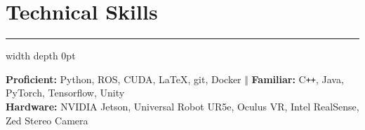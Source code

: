 \documentclass[11pt]{article}
\begin{document}
    \section*{Technical Skills}
        \hrule height 0.5pt width \textwidth depth 0pt \relax
        \vspace{0.1cm}

        \textbf{Proficient:} Python, ROS, CUDA, \LaTeX, git, Docker $\Vert$ \textbf{Familiar:}
        C\texttt{++}, Java, PyTorch, Tensorflow, Unity\\
        \textbf{Hardware:} NVIDIA Jetson, Universal Robot UR5e, Oculus VR, Intel RealSense, Zed
        Stereo Camera
\end{document}
